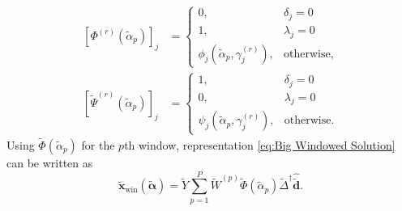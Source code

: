 \documentclass[12pt]{article}
\newcommand{\dVec}{\mathbf{d}}	%
\newcommand{\xVec}{\mathbf{x}}	%
\newcommand{\pinv}[1]{{#1}^\dagger}	%
\newcommand{\dft}[1]{\widehat{#1}}	%
\newcommand{\regparam}{\alpha}  %
\newcommand{\regparamVec}{\bm{\regparam}}   %
\newcommand{\regparamVecBig}{\widetilde{\regparamVec}}   %
\newcommand{\xBig}{\widetilde{\xVec}}	%
\newcommand{\xWinBig}{\xBig_{\text{win}}}	%
\newcommand{\dBig}{\widetilde{\dVec}}	%
\newcommand{\filt}{\phi}
\newcommand{\mfilt}{\psi}
\begin{document}
\begin{align*}
    \left[\Phi^{(r)}\left(\widetilde{\regparam}_{p}\right)\right]_j &= \begin{cases}
0, & \delta_j = 0 \\
1, & \lambda_j = 0 \\
\filt_j\left(\widetilde{\regparam}_{p},\gamma_j^{(r)}\right), & \text{otherwise,}
\end{cases} \\
\left[\widetilde{\Psi}^{(r)}\left(\widetilde{\regparam}_{p}\right)\right]_j &= \begin{cases}
1, & \delta_j = 0 \\
0, & \lambda_j = 0 \\
\mfilt_j\left(\widetilde{\regparam}_{p},\gamma_j^{(r)}\right), & \text{otherwise.}
\end{cases}
\end{align*}
Using $\widetilde{\Phi}\left(\widetilde{\regparam}_{p}\right)$ for the $p$th window, representation \eqref{eq:Big Windowed Solution} can be written as
\[\xWinBig(\regparamVecBig) = \widetilde{Y}\sum_{p=1}^{P} \widetilde{W}^{(p)}\widetilde{\Phi}\left(\widetilde{\regparam}_{p}\right)\pinv{\widetilde{\Delta}}\dft{\dBig}.\]
\end{document}
